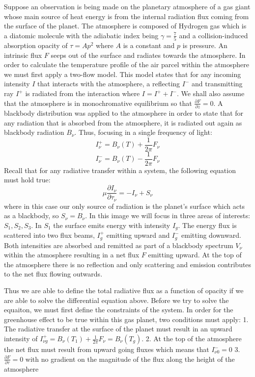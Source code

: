 \documentclass[11pt]{article}
\begin{document}
Suppose an observation is being made on the planetary atmosphere of a
gas giant whose main source of heat energy is from the internal
radiation flux coming from the surface of the planet. The atmosphere is
composed of Hydrogen gas which is a diatomic molecule with the adiabatic
index being \(\gamma = \frac{7}{5}\) and a collision-induced absorption
opacity of \(\tau = A p^2\) where \(A\) is a constant and \(p\) is
pressure. An intrinsic flux \(F\) seeps out of the surface and radiates
towards the atmosphere. In order to calculate the temperature profile of
the air parcel within the atmosphere we must first apply a two-flow
model. This model states that for any incoming intensity \(I\) that
interacts with the atmosphere, a reflecting \(I^{-}\) and transmitting
ray \(I^{+}\) is radiated from the interaction where
\(I = I^{+} + I^{-}\). We shall also assume that the atmosphere is in
monochromative equilibrium so that
\(\frac{\partial F}{\partial z} = 0\). A blackbody distribution was
applied to the atmosphere in order to state that for any radiation that
is absorbed from the atmosphere, it is radiated out again as blackbody
radiation \(B_{\nu}\). Thus, focusing in a single frequency of light:
\[I^{+}_{\nu} = B_{\nu}(T) + \frac{1}{2\pi}F_{\nu}\]
\[I^{-}_{\nu} = B_{\nu}(T) - \frac{1}{2\pi}F_{\nu}\] Recall that for any
radiative transfer within a system, the following equation must hold
true:
\[\mu \frac{\partial I_{\nu}}{\partial \tau_{\nu}} = - I_{\nu} + S_{\nu}\]
where in this case our only source of radiation is the planet's surface
which acts as a blackbody, so \(S_{\nu} = B_{\nu}\). In this image we
will focus in three areas of interests: \(S_1, S_2, S_3\). In \(S_1\)
the surface emits energy with intensity \(I_g\). The energy flux is
scattered into two flux beams, \(I_g^+\) emitting upward and \(I_g^-\)
emitting downward. Both intensities are absorbed and remitted as part of
a blackbody spectrum \(V_{\nu}\) within the atmosphere resulting in a
net flux \(F\) emitting upward. At the top of the atmosphere there is no
reflection and only scattering and emission contributes to the net flux
flowing outwards.

Thus we are able to define the total radiative flux as a function of
opacity if we are able to solve the differential equation above. Before
we try to solve the equaiton, we must first define the constraints of
the system. In order for the greenhouse effect to be true within this
gas planet, two conditions must apply: 1. The radiative transfer at the
surface of the planet must result in an upward intensity of
\(I^{+}_{\nu g} = B_{\nu}(T_1) + \frac{1}{2\pi}F_{\nu} = B_{\nu}(T_g)\).
2. At the top of the atmosphere the net flux must result from upward
going fluxes which means that \(I^{-}_{\nu 0} = 0\) 3.
\(\frac{\partial F}{\partial \tau} = 0\) with no gradient on the
magnitude of the flux along the height of the atmosphere
\end{document}
